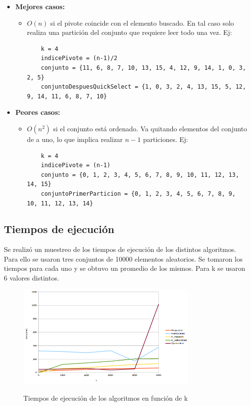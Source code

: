 \documentclass[a4paper,10pt]{article}
\begin{document}
\begin{itemize}
\item \textbf{Mejores casos:}
	\begin{itemize}
	\item $O(n)$ si el pivote coincide con el elemento buscado. En tal caso solo realiza una partición del conjunto que requiere leer todo una vez. Ej:
	\begin{verbatim}
	k = 4
	indicePivote = (n-1)/2
	conjunto = {11, 6, 8, 7, 10, 13, 15, 4, 12, 9, 14, 1, 0, 3, 2, 5}
	conjuntoDespuesQuickSelect = {1, 0, 3, 2, 4, 13, 15, 5, 12, 9, 14, 11, 6, 8, 7, 10}
	\end{verbatim}
	\end{itemize}
\item \textbf{Peores casos:}
	\begin{itemize}
	\item $O(n^2)$ si el conjunto está ordenado. Va quitando elementos del conjunto de a uno, lo que implica realizar $n-1$ particiones. Ej:
	\begin{verbatim}
	k = 4
	indicePivote = (n-1)
	conjunto = {0, 1, 2, 3, 4, 5, 6, 7, 8, 9, 10, 11, 12, 13, 14, 15}
	conjuntoPrimerParticion = {0, 1, 2, 3, 4, 5, 6, 7, 8, 9, 10, 11, 12, 13, 14}
	\end{verbatim}
	\end{itemize}
\end{itemize}


\subsection{Tiempos de ejecución}

Se realizó un muestreo de los tiempos de ejecución de los distintos algoritmos. Para ello se usaron tres conjuntos de 10000 elementos aleatorios. Se tomaron los tiempos para cada uno y se obtuvo un promedio de los mismos. Para k se usaron 6 valores distintos.

\begin{figure}[H]
\begin{center}
\includegraphics[width=0.8\textwidth]{./tiempoSegunK.png}
\label{fig:tiempos}
\caption{Tiempos de ejecución de los algoritmos en función de k}
\end{center}
\end{figure}
\end{document}
